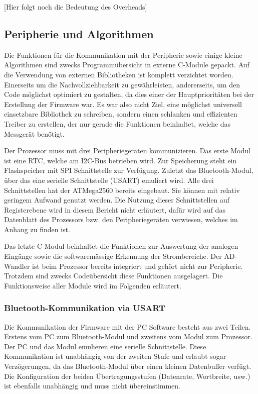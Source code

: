 [Hier folgt noch die Bedeutung des Overheads]

\subsection{Peripherie und Algorithmen}

Die Funktionen für die Kommunikation mit der Peripherie sowie einige kleine Algorithmen sind zwecks Programmübersicht in externe C-Module gepackt. Auf die Verwendung von externen Bibliotheken ist komplett verzichtet worden. Einerseits um die Nachvollziehbarkeit zu gewährleisten, andererseits, um den Code möglichst optimiert zu gestalten, da dies einer der Hauptprioritäten bei der Erstellung der Firmware war. Es war also nicht Ziel, eine möglichst universell einsetzbare Bibliothek zu schreiben, sondern einen schlanken und effizienten Treiber zu erstellen, der nur gerade die Funktionen beinhaltet, welche das Messgerät benötigt.
 
Der Prozessor muss mit drei Peripheriegeräten kommunizieren. Das erste Modul ist eine RTC, welche am I2C-Bus betrieben wird. Zur Speicherung steht ein Flashspeicher mit SPI Schnittstelle zur Verfügung. Zuletzt das Bluetooth-Modul, über das eine serielle Schnittstelle (USART) emuliert wird. Alle drei Schnittstellen hat der ATMega2560 bereits eingebaut. Sie können mit relativ geringem Aufwand genutzt werden. Die Nutzung dieser Schnittstellen auf \glqq Registerebene\grqq{} wird in diesem Bericht nicht erläutert, dafür wird auf das Datenblatt des Prozessors bzw. den Peripheriegeräten verwiesen, welches im Anhang zu finden ist. 

Das letzte C-Modul beinhaltet die Funktionen zur Auswertung der analogen Eingänge sowie die softwaremässige Erkennung der Strombereiche. Der AD-Wandler ist beim Prozessor bereits integriert und gehört nicht zur Peripherie. Trotzdem sind zwecks Codeübersicht diese Funktionen ausgelagert. Die Funktionsweise aller Module wird im Folgenden erläutert.

\subsubsection*{Bluetooth-Kommunikation via USART}
Die Kommunikation der Firmware mit der PC Software besteht aus zwei Teilen. Erstens vom PC zum Bluetooth-Modul und zweitens vom Modul zum Prozessor. Der PC und das Modul emulieren eine serielle Schnittstelle. Diese Kommunikation ist unabhängig von der zweiten Stufe und erlaubt sogar Verzögerungen, da das Bluetooth-Modul über einen kleinen Datenbuffer verfügt. Die Konfiguration der beiden Übertragungsstufen (Datenrate, Wortbreite, usw.) ist ebenfalls unabhängig und muss nicht übereinstimmen.  

